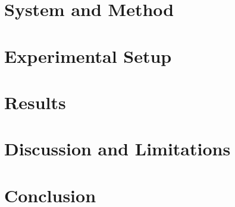 \documentclass[sigconf]{acmart}
\begin{document}
\section{System and Method}
\section{Experimental Setup}

\section{Results}


\section{Discussion and Limitations}

\section{Conclusion}

\begin{acks}
\end{acks}


\end{document}
